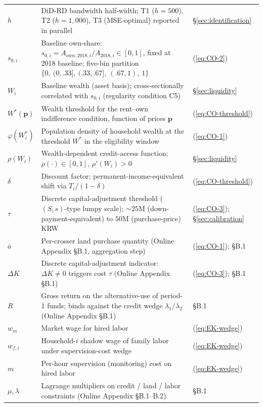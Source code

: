 \documentclass[12pt, a4paper]{article}
\begin{document}
\begin{table}[ht]
\begin{tabular}{p{2.3cm} p{8.8cm} p{2.6cm}}
$h$ & DiD-RD bandwidth half-width; T1 ($h\!=\!500$), T2 ($h\!=\!1{,}000$), T3 (MSE-optimal) reported in parallel & \S\ref{sec:identification} \\
$s_{0,i}$ & Baseline own-share: $s_{0,i} = A_{own,2018,i}/A_{2018,i} \in [0,1]$, fixed at 2018 baseline; five-bin partition $\{0,\ (0,.33],\ (.33,.67],\ (.67,1),\ 1\}$ & (\ref{eq:CO-2}) \\
$W_i$ & Baseline wealth (asset basis); cross-sectionally correlated with $s_{0,i}$ (regularity condition C5) & \S\ref{sec:liquidity} \\
$W^*(\mathbf{p})$ & Wealth threshold for the rent--own indifference condition, function of prices $\mathbf{p}$ & (\ref{eq:CO-threshold}) \\
$\varphi(W_i^*)$ & Population density of household wealth at the threshold $W^*$ in the eligibility window & (\ref{eq:CO-1}) \\
$\rho(W_i)$ & Wealth-dependent credit-access function; $\rho(\cdot) \in [0,1]$, $\rho'(W_i) > 0$ & \S\ref{sec:liquidity} \\
$\delta$ & Discount factor; permanent-income-equivalent shift via $T_i/(1-\delta)$ & (\ref{eq:CO-threshold}) \\
$\tau$ & Discrete capital-adjustment threshold ($(S,s)$-type lumpy scale); ${\sim}25$M (down-payment-equivalent) to $50$M (purchase-price) KRW & (\ref{eq:CO-3}); \S\ref{sec:calibration} \\
$\bar a$ & Per-crosser land purchase quantity (Online Appendix \S B.1, aggregation step) & (\ref{eq:CO-1}); \S B.1 \\
$\Delta K$ & Discrete capital-adjustment indicator: $\Delta K \ne 0$ triggers cost $\tau$ (Online Appendix \S B.1) & (\ref{eq:CO-3}); \S B.1 \\
$R$ & Gross return on the alternative-use of period-1 funds; binds against the credit wedge $\lambda_1/\lambda_2$ (Online Appendix \S B.1) & \S B.1 \\
$w_m$ & Market wage for hired labor & (\ref{eq:EK-wedge}) \\
$w_{f,i}$ & Household-$i$ shadow wage of family labor under supervision-cost wedge & (\ref{eq:EK-wedge}) \\
$m$ & Per-hour supervision (monitoring) cost on hired labor & (\ref{eq:EK-wedge}) \\
$\mu, \lambda$ & Lagrange multipliers on credit / land / labor constraints (Online Appendix \S B.1--B.2) & \S B.1 \\
\bottomrule
\end{tabular}
\end{table}
\end{document}
